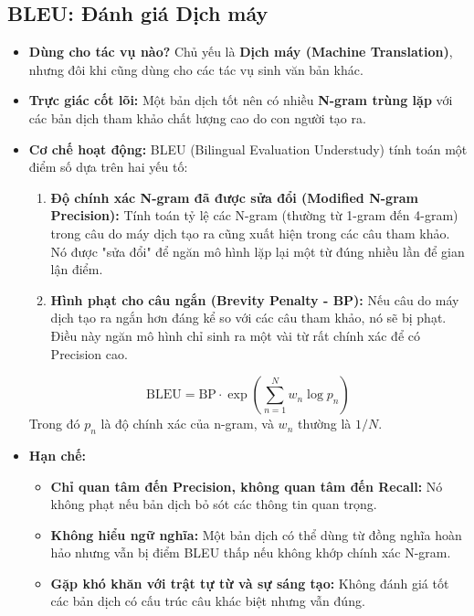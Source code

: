 \subsection{BLEU: Đánh giá Dịch máy}
\label{ssec:bleu}
\begin{itemize}
    \item \textbf{Dùng cho tác vụ nào?} Chủ yếu là \textbf{Dịch máy (Machine Translation)}, nhưng đôi khi cũng dùng cho các tác vụ sinh văn bản khác.
    \item \textbf{Trực giác cốt lõi:} Một bản dịch tốt nên có nhiều \textbf{N-gram trùng lặp} với các bản dịch tham khảo chất lượng cao do con người tạo ra.
    \item \textbf{Cơ chế hoạt động:} BLEU (Bilingual Evaluation Understudy) tính toán một điểm số dựa trên hai yếu tố:
        \begin{enumerate}
            \item \textbf{Độ chính xác N-gram đã được sửa đổi (Modified N-gram Precision):} Tính toán tỷ lệ các N-gram (thường từ 1-gram đến 4-gram) trong câu do máy dịch tạo ra cũng xuất hiện trong các câu tham khảo. Nó được "sửa đổi" để ngăn mô hình lặp lại một từ đúng nhiều lần để gian lận điểm.
            \item \textbf{Hình phạt cho câu ngắn (Brevity Penalty - BP):} Nếu câu do máy dịch tạo ra ngắn hơn đáng kể so với các câu tham khảo, nó sẽ bị phạt. Điều này ngăn mô hình chỉ sinh ra một vài từ rất chính xác để có Precision cao.
        \end{enumerate}
        $$ \text{BLEU} = \text{BP} \cdot \exp\left(\sum_{n=1}^{N} w_n \log p_n\right) $$
        Trong đó $p_n$ là độ chính xác của n-gram, và $w_n$ thường là $1/N$.
    \item \textbf{Hạn chế:}
        \begin{itemize}
            \item \textbf{Chỉ quan tâm đến Precision, không quan tâm đến Recall:} Nó không phạt nếu bản dịch bỏ sót các thông tin quan trọng.
            \item \textbf{Không hiểu ngữ nghĩa:} Một bản dịch có thể dùng từ đồng nghĩa hoàn hảo nhưng vẫn bị điểm BLEU thấp nếu không khớp chính xác N-gram.
            \item \textbf{Gặp khó khăn với trật tự từ và sự sáng tạo:} Không đánh giá tốt các bản dịch có cấu trúc câu khác biệt nhưng vẫn đúng.
        \end{itemize}
\end{itemize}

